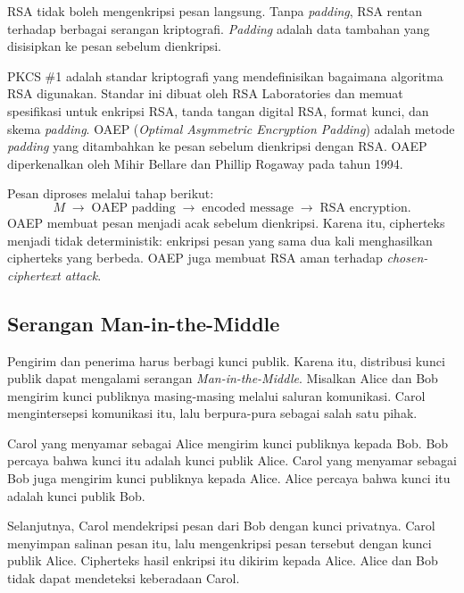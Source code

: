 RSA tidak boleh mengenkripsi pesan langsung. Tanpa \textit{padding}, RSA rentan
terhadap berbagai serangan kriptografi. \textit{Padding} adalah data tambahan
yang disisipkan ke pesan sebelum dienkripsi.

PKCS \#1 adalah standar kriptografi yang mendefinisikan bagaimana algoritma RSA
digunakan. Standar ini dibuat oleh RSA Laboratories dan memuat spesifikasi
untuk enkripsi RSA, tanda tangan digital RSA, format kunci, dan skema
\textit{padding}. OAEP (\textit{Optimal Asymmetric Encryption Padding}) adalah
metode \textit{padding} yang ditambahkan ke pesan sebelum dienkripsi dengan
RSA. OAEP diperkenalkan oleh Mihir Bellare dan Phillip Rogaway pada tahun 1994.

Pesan diproses melalui tahap berikut:
\[
M \;\rightarrow\; \text{OAEP padding} \;\rightarrow\;
\text{encoded message} \;\rightarrow\; \text{RSA encryption}.
\]
OAEP membuat pesan menjadi acak sebelum dienkripsi. Karena itu, cipherteks
menjadi tidak deterministik: enkripsi pesan yang sama dua kali menghasilkan
cipherteks yang berbeda. OAEP juga membuat RSA aman terhadap
\textit{chosen-ciphertext attack}.

\subsection{Serangan Man-in-the-Middle}

Pengirim dan penerima harus berbagi kunci publik. Karena itu, distribusi kunci
publik dapat mengalami serangan \textit{Man-in-the-Middle}. Misalkan Alice dan
Bob mengirim kunci publiknya masing-masing melalui saluran komunikasi. Carol
mengintersepsi komunikasi itu, lalu berpura-pura sebagai salah satu pihak.

Carol yang menyamar sebagai Alice mengirim kunci publiknya kepada Bob. Bob
percaya bahwa kunci itu adalah kunci publik Alice. Carol yang menyamar sebagai
Bob juga mengirim kunci publiknya kepada Alice. Alice percaya bahwa kunci itu
adalah kunci publik Bob.

Selanjutnya, Carol mendekripsi pesan dari Bob dengan kunci privatnya. Carol
menyimpan salinan pesan itu, lalu mengenkripsi pesan tersebut dengan kunci
publik Alice. Cipherteks hasil enkripsi itu dikirim kepada Alice. Alice dan Bob
tidak dapat mendeteksi keberadaan Carol.

